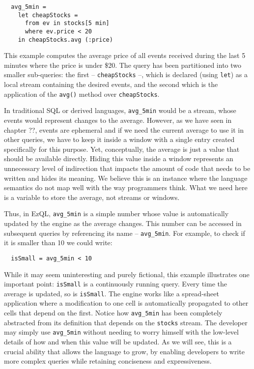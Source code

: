 \documentclass[a4,11pt]{report}
\begin{document}
\begin{lstlisting}
  avg_5min =
    let cheapStocks =
      from ev in stocks[5 min]
      where ev.price < 20
    in cheapStocks.avg (:price)
\end{lstlisting}

This example computes the average price of all events received during
the last 5 minutes where the price is under \$20. The query has been
partitioned into two smaller sub-queries: the first --
\verb=cheapStocks= --, which is declared (using \verb=let=) as a local
stream containing the desired events, and the second which is the
application of the \verb=avg()= method over \verb=cheapStocks=.

In traditional SQL or derived languages, \verb=avg_5min= would be a
stream, whose events would represent changes to the average. However,
as we have seen in chapter ??, events are ephemeral and if we need the
current average to use it in other queries, we have to keep it inside
a window with a single entry created specifically for this
purpose. Yet, conceptually, the average is just a value that should be
available directly. Hiding this value inside a window represents an
unnecessary level of indirection that impacts the amount of code that
needs to be written and hides its meaning.  We believe this is an
instance where the language semantics do not map well with the way
programmers think. What we need here is a variable to store the
average, not streams or windows.

Thus, in EzQL, \verb=avg_5min= is a simple number whose value is
automatically updated by the engine as the average changes. This
number can be accessed in subsequent queries by referencing its name
-- \verb=avg_5min=. For example, to check if it is smaller than 10 we
could write:

\begin{lstlisting}
  isSmall = avg_5min < 10
\end{lstlisting}

While it may seem uninteresting and purely fictional, this example
illustrates one important point: \verb=isSmall= is a continuously
running query. Every time the average is updated, so is
\verb=isSmall=. The engine works like a spread-sheet application where
a modification to one cell is automatically propagated to other cells
that depend on the first. Notice how \verb=avg_5min= has been
completely abstracted from its definition that depends on the
\verb=stocks= stream. The developer may simply use \verb=avg_5min=
without needing to worry himself with the low-level details of how and
when this value will be updated. As we will see, this is a crucial
ability that allows the language to grow, by enabling developers to
write more complex queries while retaining conciseness and
expressiveness.
\end{document}
